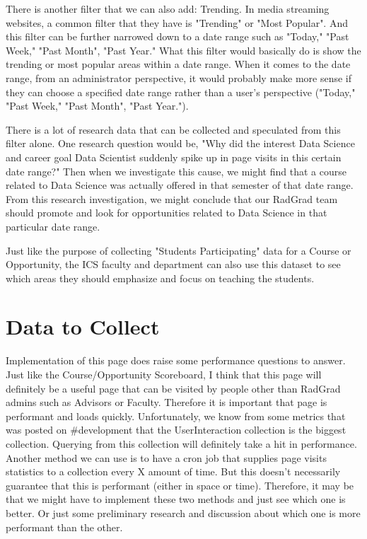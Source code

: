 \documentclass[english]{proposalnsf}
\begin{document}
    There is another filter that we can also add: Trending.
    In media streaming websites, a common filter that they have is "Trending" or "Most Popular".
    And this filter can be further narrowed down to a date range such as "Today," "Past Week," "Past Month", "Past Year." What this filter would basically do is show the trending or most popular areas within a date range.
    When it comes to the date range, from an administrator perspective, it would probably make more sense if they can choose a specified date range rather than a user's perspective ("Today," "Past Week," "Past Month", "Past Year.").

    There is a lot of research data that can be collected and speculated from this filter alone.
    One research question would be, "Why did the interest Data Science and career goal Data Scientist suddenly spike up in page visits in this certain date range?" Then when we investigate this cause, we might find that a course related to Data Science was actually offered in that semester of that date range.
    From this research investigation, we might conclude that our RadGrad team should promote and look for opportunities related to Data Science in that particular date range.

    Just like the purpose of collecting "Students Participating" data for a Course or Opportunity, the ICS faculty and department can also use this dataset to see which areas they should emphasize and focus on teaching the students.

    \section{Data to Collect}
    \label{sec:data-to-collect}
    Implementation of this page does raise some performance questions to answer.
    Just like the Course/Opportunity Scoreboard, I think that this page will definitely be a useful page that can be visited by people other than RadGrad admins such as Advisors or Faculty.
    Therefore it is important that page is performant and loads quickly.
    Unfortunately, we know from some metrics that was posted on #development that the UserInteraction collection is the biggest collection.
    Querying from this collection will definitely take a hit in performance.
    Another method we can use is to have a cron job that supplies page visits statistics to a collection every X amount of time.
    But this doesn't necessarily guarantee that this is performant (either in space or time).
    Therefore, it may be that we might have to implement these two methods and just see which one is better.
    Or just some preliminary research and discussion about which one is more performant than the other.

    
    

    \appendix
\end{document}
